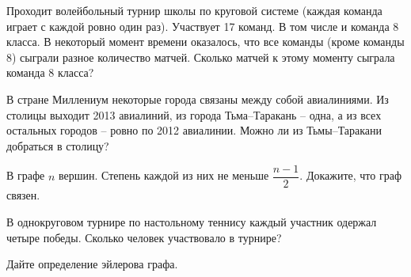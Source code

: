 \begin{thm}
    Проходит волейбольный турнир школы по круговой системе (каждая команда играет с каждой ровно один раз). Участвует 17 команд. В том числе и команда 8 класса. В некоторый момент времени оказалось, что все команды (кроме команды 8) сыграли разное количество матчей. Сколько матчей к этому моменту сыграла команда 8 класса?
\end{thm}

\begin{thm}
    В стране Миллениум некоторые города связаны между собой авиалиниями. Из столицы выходит 2013 авиалиний, из города Тьма--Таракань -- одна, а из всех остальных городов -- ровно по 2012 авиалинии. Можно ли из Тьмы--Таракани добраться в столицу?
\end{thm}

\begin{thm}
    В графе $n$ вершин. Степень каждой из них не меньше $\dfrac{n - 1}{2}$. Докажите, что граф связен.
\end{thm}

\begin{thm}
    В однокруговом турнире по настольному теннису каждый участник одержал четыре победы. Сколько человек участвовало в турнире?
\end{thm}

\begin{thm}
    Дайте определение эйлерова графа.
\end{thm}